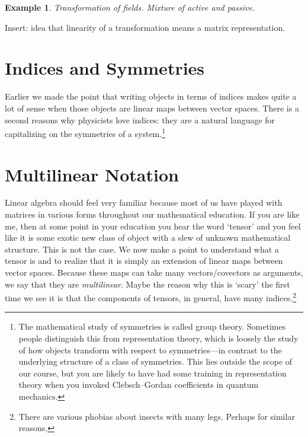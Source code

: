 \documentclass[
  11pt,
	colorful,
	raggedright,
]{tufte-style-thesis-flip}
\newtheorem{example}{Example}[section]
\begin{document}

\begin{example}
Transformation of fields. Mixture of active and passive.
\end{example}

Insert: idea that linearity of a transformation means a matrix representation. 


\section{Indices and Symmetries}

Earlier we made the point that writing objects in terms of indices makes quite a lot of sense when those objects are linear maps between vector spaces. There is a second reasons why physicists love indices: they are a natural language for capitalizing on the symmetries of a system.\footnote{The mathematical study of symmetries is called group theory. Sometimes people distinguish this from representation theory, which is loosely the study of how objects transform with respect to symmetries---in contrast to the underlying structure of a class of symmetries. This lies outside the scope of our course, but you are likely to have had some training in representation theory when you invoked Clebsch--Gordan coefficients in quantum mechanics.}

\section{Multilinear Notation} %

Linear algebra should feel very familiar because most of us have played with matrices in various forms throughout our mathematical education. If you are like me, then at some point in your education you hear the word `tensor' and you feel like it is some exotic new class of object with a slew of unknown mathematical structure. This is not the case. We now make a point to understand what a tensor is and to realize that it is simply an extension of linear maps between vector spaces. Because these maps can take many vectors/covectors as arguments, we say that they are \emph{multilinear}. Maybe the reason why this is `scary' the first time we see it is that the components of tensors, in general, have many indices.\footnote{There are various phobias about insects with many legs. Perhaps for similar reasons.}
\end{document}

